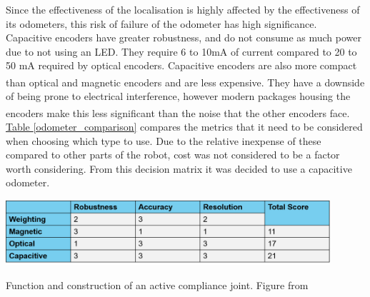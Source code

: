 \documentclass[11pt]{article}		%
\newcommand{\supercite}[1]{\textsuperscript{\cite{#1}}}		%
\newcommand{\tableref}[1]{\hyperref[#1]{Table \ref*{#1}}}     %
\begin{document}
	        Since the effectiveness of the localisation is highly affected by  the effectiveness of its odometers, this risk of failure of the odometer has high significance.
	        \\
	        Capacitive encoders have greater robustness, and do not consume as much power due to not using an LED. 
	        They require 6 to 10mA of current compared to 20 to 50 mA required by optical encoders.
	        Capacitive encoders are also more compact than optical and magnetic encoders and are less expensive\supercite{Encoders}. 
	        They have a downside of being prone to electrical interference, however modern packages housing the encoders make this less significant than the noise that the other encoders face.\supercite{Encoders}
	        \\
	        \tableref{odometer_comparison} compares the metrics that it need to be considered when choosing which type to use. 
	        Due to the relative inexpense of these compared to other parts of the robot, cost was not considered to be a factor worth considering. 
	        From this decision matrix it was decided to use a capacitive odometer. 
	        \begin{table}[h]
						\centering
							\includegraphics[width=0.9\textwidth]{Encoder comparison table}
							\caption{Function and construction of an active compliance joint. Figure from \cite{park2010normal}}
							\label{odometer_comparison}
					\end{table}
\end{document}
